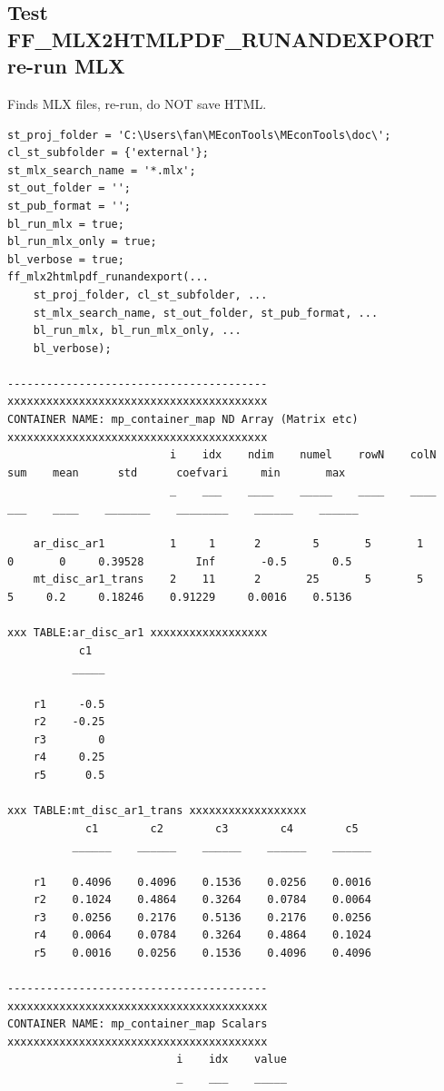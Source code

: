 \documentclass[
]{book}
\begin{document}
\hypertarget{test-ff_mlx2htmlpdf_runandexport-re-run-mlx}{%
\subsection{Test FF\_MLX2HTMLPDF\_RUNANDEXPORT re-run MLX}\label{test-ff_mlx2htmlpdf_runandexport-re-run-mlx}}

Finds MLX files, re-run, do NOT save HTML.

\begin{verbatim}
st_proj_folder = 'C:\Users\fan\MEconTools\MEconTools\doc\';
cl_st_subfolder = {'external'};
st_mlx_search_name = '*.mlx';
st_out_folder = '';
st_pub_format = '';
bl_run_mlx = true;
bl_run_mlx_only = true;
bl_verbose = true;
ff_mlx2htmlpdf_runandexport(...
    st_proj_folder, cl_st_subfolder, ...
    st_mlx_search_name, st_out_folder, st_pub_format, ...
    bl_run_mlx, bl_run_mlx_only, ...
    bl_verbose);

----------------------------------------
xxxxxxxxxxxxxxxxxxxxxxxxxxxxxxxxxxxxxxxx
CONTAINER NAME: mp_container_map ND Array (Matrix etc)
xxxxxxxxxxxxxxxxxxxxxxxxxxxxxxxxxxxxxxxx
                         i    idx    ndim    numel    rowN    colN    sum    mean      std      coefvari     min       max  
                         _    ___    ____    _____    ____    ____    ___    ____    _______    ________    ______    ______

    ar_disc_ar1          1     1      2        5       5       1       0       0     0.39528        Inf       -0.5       0.5
    mt_disc_ar1_trans    2    11      2       25       5       5       5     0.2     0.18246    0.91229     0.0016    0.5136

xxx TABLE:ar_disc_ar1 xxxxxxxxxxxxxxxxxx
           c1  
          _____

    r1     -0.5
    r2    -0.25
    r3        0
    r4     0.25
    r5      0.5

xxx TABLE:mt_disc_ar1_trans xxxxxxxxxxxxxxxxxx
            c1        c2        c3        c4        c5  
          ______    ______    ______    ______    ______

    r1    0.4096    0.4096    0.1536    0.0256    0.0016
    r2    0.1024    0.4864    0.3264    0.0784    0.0064
    r3    0.0256    0.2176    0.5136    0.2176    0.0256
    r4    0.0064    0.0784    0.3264    0.4864    0.1024
    r5    0.0016    0.0256    0.1536    0.4096    0.4096

----------------------------------------
xxxxxxxxxxxxxxxxxxxxxxxxxxxxxxxxxxxxxxxx
CONTAINER NAME: mp_container_map Scalars
xxxxxxxxxxxxxxxxxxxxxxxxxxxxxxxxxxxxxxxx
                          i    idx    value
                          _    ___    _____


\end{verbatim}
\end{document}
